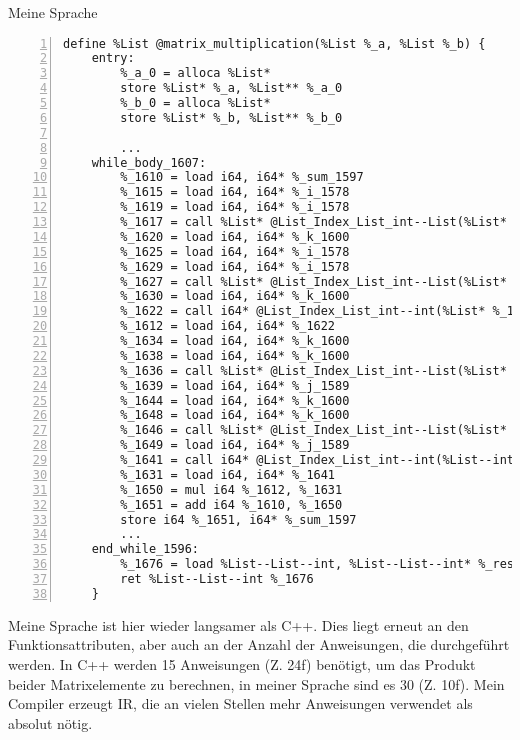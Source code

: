     \begin{center}
        Meine Sprache
    \end{center}

    \begin{lstlisting}[basicstyle=\tiny, numbers=left]
    define %List @matrix_multiplication(%List %_a, %List %_b) {
    entry:
        %_a_0 = alloca %List*
        store %List* %_a, %List** %_a_0
        %_b_0 = alloca %List*
        store %List* %_b, %List** %_b_0

        ...
    while_body_1607:
        %_1610 = load i64, i64* %_sum_1597
        %_1615 = load i64, i64* %_i_1578
        %_1619 = load i64, i64* %_i_1578
        %_1617 = call %List* @List_Index_List_int--List(%List* %_a_1550,i64 %_1619)
        %_1620 = load i64, i64* %_k_1600
        %_1625 = load i64, i64* %_i_1578
        %_1629 = load i64, i64* %_i_1578
        %_1627 = call %List* @List_Index_List_int--List(%List* %_a_1550,i64 %_1629)
        %_1630 = load i64, i64* %_k_1600
        %_1622 = call i64* @List_Index_List_int--int(%List* %_1627,i64 %_1630)
        %_1612 = load i64, i64* %_1622
        %_1634 = load i64, i64* %_k_1600
        %_1638 = load i64, i64* %_k_1600
        %_1636 = call %List* @List_Index_List_int--List(%List* %_b_1554,i64 %_1638)
        %_1639 = load i64, i64* %_j_1589
        %_1644 = load i64, i64* %_k_1600
        %_1648 = load i64, i64* %_k_1600
        %_1646 = call %List* @List_Index_List_int--List(%List* %_b_1554,i64 %_1648)
        %_1649 = load i64, i64* %_j_1589
        %_1641 = call i64* @List_Index_List_int--int(%List--int* %_1646,i64 %_1649)
        %_1631 = load i64, i64* %_1641
        %_1650 = mul i64 %_1612, %_1631
        %_1651 = add i64 %_1610, %_1650
        store i64 %_1651, i64* %_sum_1597
        ...
    end_while_1596:
        %_1676 = load %List--List--int, %List--List--int* %_result_1547
        ret %List--List--int %_1676
    }

    \end{lstlisting}

    Meine Sprache ist hier wieder langsamer als C++. Dies liegt erneut an den Funktionsattributen, aber auch an der Anzahl der Anweisungen, die durchgeführt werden. In C++ werden 15 Anweisungen (Z. 24f) benötigt, 
    um das Produkt beider Matrixelemente zu berechnen, in meiner Sprache sind es 30 (Z. 10f).
    Mein Compiler erzeugt IR, die an vielen Stellen mehr Anweisungen verwendet als absolut nötig.

    



    




    


 
    

